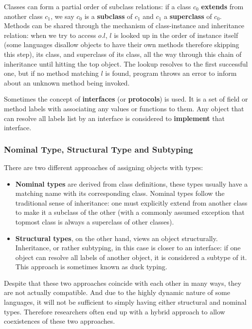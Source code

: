 Classes can form a partial order of subclass relations: if a class $c_0$ \textbf{extends} from
another class $c_1$, we say $c_0$ is a \textbf{subclass} of $c_1$ and $c_1$ a \textbf{superclass} of $c_0$.
Methods can be shared through the mechanism of class-instance and inheritance relation:
when we try to access $o.l$, $l$ is looked up in the order of instance itself (some languages disallow
objects to have their own methods therefore skipping this step), its class, and superclass of its class,
all the way through this chain of inheritance until hitting the top object.
The lookup resolves to the first successful one,
but if no method matching $l$ is found, program throws an error to inform about an unknown method being invoked.

Sometimes the concept of \textbf{interfaces} (or \textbf{protocols}) is used. It is a set of
field or method labels with associating any values or functions to them.
Any object that can resolve all labels list by an interface is considered to
\textbf{implement} that interface.

\subsubsection{Nominal Type, Structural Type and Subtyping}

There are two different approaches of assigning objects with types:

\begin{itemize}
	\item \textbf{Nominal types} are derived from class definitions, these types usually have a matching name with its
	corresponding class.  Nominal types follow the traditional sense of inheritance:
	one must explicitly extend from another class to make it a subclass of the other
	(with a commonly assumed exception that topmost class is always a superclass of other classes).
	\item \textbf{Structural types}, on the other hand, views an object structurally.
	Inheritance, or rather subtyping, in this case is closer to an interface: if one object can resolve all labels of another object, it is considered a subtype of it. This approach is sometimes known as duck typing.
\end{itemize}

Despite that these two approaches coincide with each other in many ways,
they are not actually compatible.
And due to the highly dynamic nature of some languages,
it will not be sufficient to simply having either structural and
nominal types.
Therefore researchers often end up with a hybrid approach
to allow coexistences of these two approaches.

